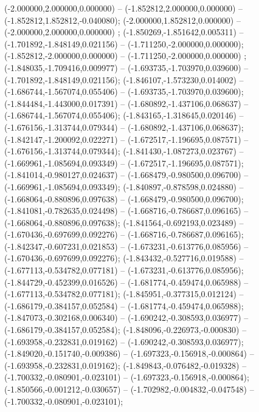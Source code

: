  (-2.000000,2.000000,0.000000) -- (-1.852812,2.000000,0.000000) -- (-1.852812,1.852812,-0.040080);
 (-2.000000,1.852812,0.000000) -- (-2.000000,2.000000,0.000000) ;
 (-1.850269,-1.851642,0.005311) -- (-1.701892,-1.848149,0.021156) -- (-1.711250,-2.000000,0.000000);
 (-1.852812,-2.000000,0.000000) -- (-1.711250,-2.000000,0.000000) ;
 (-1.848035,-1.709416,0.009977) -- (-1.693735,-1.703970,0.039600) -- (-1.701892,-1.848149,0.021156);
 (-1.846107,-1.573230,0.014002) -- (-1.686744,-1.567074,0.055406) -- (-1.693735,-1.703970,0.039600);
 (-1.844484,-1.443000,0.017391) -- (-1.680892,-1.437106,0.068637) -- (-1.686744,-1.567074,0.055406);
 (-1.843165,-1.318645,0.020146) -- (-1.676156,-1.313744,0.079344) -- (-1.680892,-1.437106,0.068637);
 (-1.842147,-1.200092,0.022271) -- (-1.672517,-1.196695,0.087571) -- (-1.676156,-1.313744,0.079344);
 (-1.841430,-1.087273,0.023767) -- (-1.669961,-1.085694,0.093349) -- (-1.672517,-1.196695,0.087571);
 (-1.841014,-0.980127,0.024637) -- (-1.668479,-0.980500,0.096700) -- (-1.669961,-1.085694,0.093349);
 (-1.840897,-0.878598,0.024880) -- (-1.668064,-0.880896,0.097638) -- (-1.668479,-0.980500,0.096700);
 (-1.841081,-0.782635,0.024498) -- (-1.668716,-0.786687,0.096165) -- (-1.668064,-0.880896,0.097638);
 (-1.841564,-0.692193,0.023489) -- (-1.670436,-0.697699,0.092276) -- (-1.668716,-0.786687,0.096165);
 (-1.842347,-0.607231,0.021853) -- (-1.673231,-0.613776,0.085956) -- (-1.670436,-0.697699,0.092276);
 (-1.843432,-0.527716,0.019588) -- (-1.677113,-0.534782,0.077181) -- (-1.673231,-0.613776,0.085956);
 (-1.844729,-0.452399,0.016526) -- (-1.681774,-0.459474,0.065988) -- (-1.677113,-0.534782,0.077181);
 (-1.845951,-0.377315,0.012124) -- (-1.686179,-0.384157,0.052584) -- (-1.681774,-0.459474,0.065988);
 (-1.847073,-0.302168,0.006340) -- (-1.690242,-0.308593,0.036977) -- (-1.686179,-0.384157,0.052584);
 (-1.848096,-0.226973,-0.000830) -- (-1.693958,-0.232831,0.019162) -- (-1.690242,-0.308593,0.036977);
 (-1.849020,-0.151740,-0.009386) -- (-1.697323,-0.156918,-0.000864) -- (-1.693958,-0.232831,0.019162);
 (-1.849843,-0.076482,-0.019328) -- (-1.700332,-0.080901,-0.023101) -- (-1.697323,-0.156918,-0.000864);
 (-1.850566,-0.001212,-0.030657) -- (-1.702982,-0.004832,-0.047548) -- (-1.700332,-0.080901,-0.023101);

